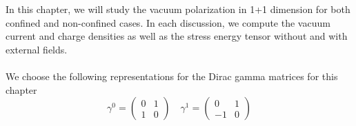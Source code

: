 In this chapter, we will study the vacuum polarization in 1+1 dimension for both confined and non-confined cases.
In each discussion,
we compute the vacuum current and charge densities as well as the stress energy tensor without and with external fields. \\\\
We choose the following representations for the Dirac gamma matrices for this chapter
\begin{equation*}
\gamma^0 = \begin{pmatrix}
0 & 1 \\
1 & 0 \end{pmatrix}  \quad  \gamma^1 = \begin{pmatrix}
0  & 1 \\
-1 & 0
\end{pmatrix}
\end{equation*}
%
